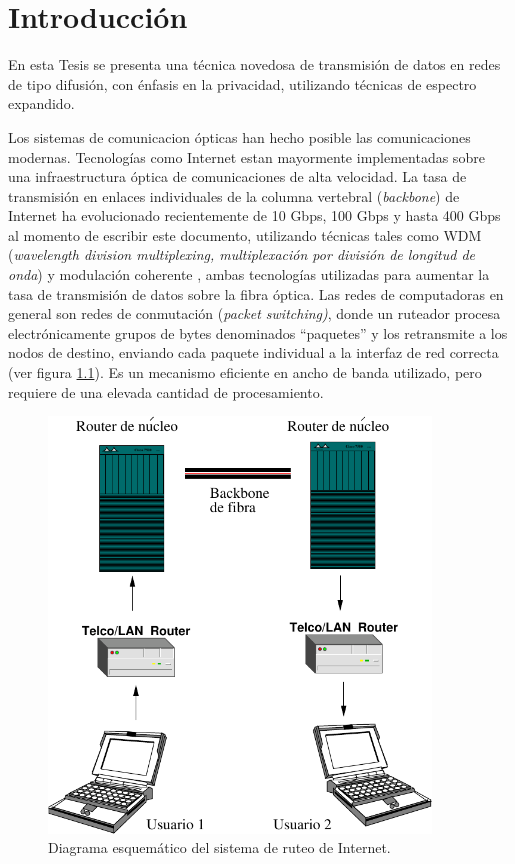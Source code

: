 \chapter{Introducción}

En esta Tesis se presenta una técnica novedosa de transmisión de datos en redes de tipo difusión, con énfasis en la privacidad, utilizando técnicas de espectro expandido.

Los sistemas de comunicacion ópticas han hecho posible las comunicaciones modernas. Tecnologías como Internet estan mayormente implementadas sobre una infraestructura óptica de comunicaciones de alta velocidad. 
La tasa de transmisión en enlaces individuales de la columna vertebral (\textit{backbone}) de Internet ha evolucionado recientemente de 10 Gbps, 100 Gbps y hasta 400 Gbps \cite{backbone} al momento de escribir este documento, utilizando técnicas tales como WDM (\textit{wavelength division multiplexing, multiplexación por división de longitud de onda}) y modulación coherente \cite{shieh2008coherent}, ambas tecnologías utilizadas para aumentar la tasa de transmisión de datos sobre la fibra óptica. 
Las redes de computadoras en general son redes de conmutación (\textit{packet switching)}, donde un ruteador procesa electrónicamente grupos de bytes denominados ``paquetes'' y los retransmite a los nodos de destino, enviando cada paquete individual a la interfaz de red correcta (ver figura \ref{arch:simp}). Es un mecanismo eficiente en ancho de banda utilizado, pero requiere de una elevada cantidad de procesamiento.

\begin{figure}[!t]
  \centering
    \includegraphics[width=4.0in]{graphs/internet.pdf}
    \caption{Diagrama esquemático del sistema de ruteo de Internet.}
    \label{arch:simp}
\end{figure}


